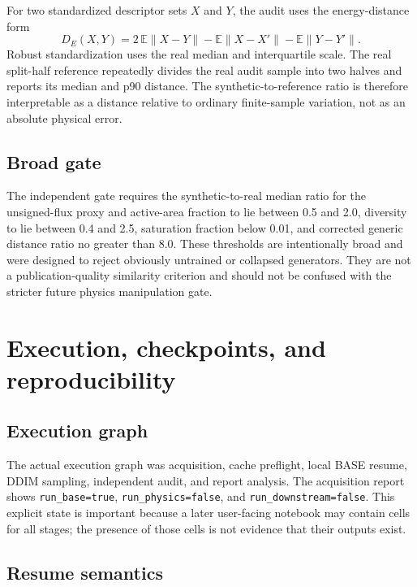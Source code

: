 \documentclass[11pt,oneside]{report}
\begin{document}
For two standardized descriptor sets $X$ and $Y$, the audit uses the energy-distance form
\begin{equation}
  D_E(X,Y)=2\,\mathbb{E}\|X-Y\|-\mathbb{E}\|X-X'\|-\mathbb{E}\|Y-Y'\|.
\end{equation}
Robust standardization uses the real median and interquartile scale. The real split-half reference repeatedly divides the real audit sample into two halves and reports its median and p90 distance. The synthetic-to-reference ratio is therefore interpretable as a distance relative to ordinary finite-sample variation, not as an absolute physical error.

\section{Broad gate}

The independent gate requires the synthetic-to-real median ratio for the unsigned-flux proxy and active-area fraction to lie between 0.5 and 2.0, diversity to lie between 0.4 and 2.5, saturation fraction below 0.01, and corrected generic distance ratio no greater than 8.0. These thresholds are intentionally broad and were designed to reject obviously untrained or collapsed generators. They are not a publication-quality similarity criterion and should not be confused with the stricter future physics manipulation gate.

\chapter{Execution, checkpoints, and reproducibility}

\section{Execution graph}

The actual execution graph was acquisition, cache preflight, local BASE resume, DDIM sampling, independent audit, and report analysis. The acquisition report shows \texttt{run\_base=true}, \texttt{run\_physics=false}, and \texttt{run\_downstream=false}. This explicit state is important because a later user-facing notebook may contain cells for all stages; the presence of those cells is not evidence that their outputs exist.

\section{Resume semantics}
\end{document}
